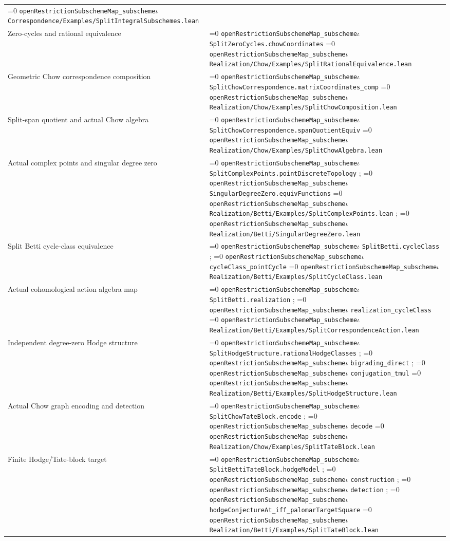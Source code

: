 \documentclass[11pt]{article}
\theoremstyle{definition}
\theoremstyle{remark}
\newcommand{\leanpath}[1]{%
  \ifnum\pdfstrcmp{\detokenize{#1}}%
      {\detokenize{openRestrictionSubschemeMap_subschemeι}}=0
    \texttt{\nolinkurl{openRestrictionSubschemeMap_subscheme}}\ensuremath{\iota}%
  \else
    \texttt{\nolinkurl{#1}}%
  \fi}
\begin{document}
\begin{longtable}{@{}>{\raggedright\arraybackslash}p{}
                >{\raggedright\arraybackslash}p{}@{}}
\leanpath{Correspondence/Examples/SplitIntegralSubschemes.lean}\\
Zero-cycles and rational equivalence &
\leanpath{SplitZeroCycles.chowCoordinates}\newline
\leanpath{Realization/Chow/Examples/SplitRationalEquivalence.lean}\\
Geometric Chow correspondence composition &
\leanpath{SplitChowCorrespondence.matrixCoordinates_comp}\newline
\leanpath{Realization/Chow/Examples/SplitChowComposition.lean}\\
Split-span quotient and actual Chow algebra &
\leanpath{SplitChowCorrespondence.spanQuotientEquiv}\newline
\leanpath{Realization/Chow/Examples/SplitChowAlgebra.lean}\\
Actual complex points and singular degree zero &
\leanpath{SplitComplexPoints.pointDiscreteTopology};
\leanpath{SingularDegreeZero.equivFunctions}\newline
\leanpath{Realization/Betti/Examples/SplitComplexPoints.lean};
\leanpath{Realization/Betti/SingularDegreeZero.lean}\\
Split Betti cycle-class equivalence &
\leanpath{SplitBetti.cycleClass}; \leanpath{cycleClass_pointCycle}\newline
\leanpath{Realization/Betti/Examples/SplitCycleClass.lean}\\
Actual cohomological action algebra map &
\leanpath{SplitBetti.realization}; \leanpath{realization_cycleClass}\newline
\leanpath{Realization/Betti/Examples/SplitCorrespondenceAction.lean}\\
Independent degree-zero Hodge structure &
\leanpath{SplitHodgeStructure.rationalHodgeClasses};
\leanpath{bigrading_direct}; \leanpath{conjugation_tmul}\newline
\leanpath{Realization/Betti/Examples/SplitHodgeStructure.lean}\\
Actual Chow graph encoding and detection &
\leanpath{SplitChowTateBlock.encode}; \leanpath{decode}\newline
\leanpath{Realization/Chow/Examples/SplitTateBlock.lean}\\
Finite Hodge/Tate-block target &
\leanpath{SplitBettiTateBlock.hodgeModel};
\leanpath{construction}; \leanpath{detection};
\leanpath{hodgeConjectureAt_iff_palomarTargetSquare}\newline
\leanpath{Realization/Betti/Examples/SplitTateBlock.lean}\\

\end{longtable}
\end{document}
